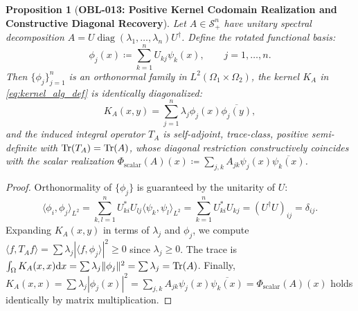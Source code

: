 \documentclass[11pt,a4paper,reqno]{amsart}
\newtheorem{proposition}[theorem]{Proposition}
\theoremstyle{definition}
\theoremstyle{remark}
\numberwithin{equation}{section}
\newcommand{\dif}{\mathrm{d}}
\begin{document}
\begin{proposition}[\textbf{OBL-013: Positive Kernel Codomain Realization and Constructive Diagonal Recovery}]
\label{prop:kernel_codomain_psd}
Let $A \in \mathcal{S}_+^n$ have unitary spectral decomposition $A = U \operatorname{diag}(\lambda_1, \dots, \lambda_n) U^\dagger$. Define the rotated functional basis:
\begin{equation}
\phi_j(x) \coloneqq \sum_{k=1}^n U_{kj} \psi_k(x), \qquad j = 1, \dots, n.
\end{equation}
Then $\{\phi_j\}_{j=1}^n$ is an orthonormal family in $L^2(\Omega_1 \times \Omega_2)$, the kernel $K_A$ in \eqref{eq:kernel_alg_def} is identically diagonalized:
\begin{equation}
K_A(x, y) = \sum_{j=1}^n \lambda_j \phi_j(x) \overline{\phi_j(y)},
\end{equation}
and the induced integral operator $T_A$ is self-adjoint, trace-class, positive semi-definite with $\Tr(T_A) = \Tr(A)$, whose diagonal restriction constructively coincides with the scalar realization $\Phi_{\mathrm{scalar}}(A)(x) \coloneqq \sum_{j,k} A_{jk} \psi_j(x) \overline{\psi_k(x)}$.
\end{proposition}

\begin{proof}
Orthonormality of $\{\phi_j\}$ is guaranteed by the unitarity of $U$:
\begin{equation}
\langle \phi_i, \phi_j \rangle_{L^2} = \sum_{k, l=1}^n U_{ki}^* U_{lj} \langle \psi_k, \psi_l \rangle_{L^2} = \sum_{k=1}^n U_{ki}^* U_{kj} = (U^\dagger U)_{ij} = \delta_{ij}.
\end{equation}
Expanding $K_A(x, y)$ in terms of $\lambda_j$ and $\phi_j$, we compute $\langle f, T_A f \rangle = \sum \lambda_j |\langle f, \phi_j \rangle|^2 \ge 0$ since $\lambda_j \ge 0$. The trace is $\int_\Omega K_A(x, x) \dif x = \sum \lambda_j \|\phi_j\|^2 = \sum \lambda_j = \Tr(A)$. Finally, $K_A(x, x) = \sum \lambda_j |\phi_j(x)|^2 = \sum_{j,k} A_{jk} \psi_j(x) \overline{\psi_k(x)} = \Phi_{\mathrm{scalar}}(A)(x)$ holds identically by matrix multiplication.
\end{proof}
\end{document}
